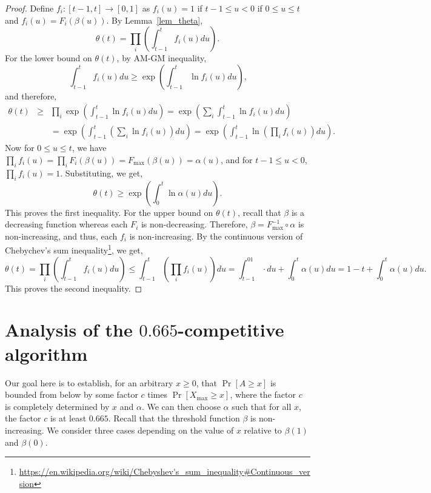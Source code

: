 \documentclass[10pt, letterpaper, twoside]{article}
\begin{document}
\begin{proof}
Define $f_i:[t-1,t]\longrightarrow[0,1]$ as $f_i(u)=1$ if $t-1\leq u<0$ if $0\leq u\leq t$ and $f_i(u)=F_i(\beta(u))$. By Lemma~\ref{lem_theta},
\[\theta(t)=\prod_i\left(\int_{t-1}^t f_i(u)du\right)\text{.}\]
For the lower bound on $\theta(t)$, by AM-GM inequality,
\[\int_{t-1}^tf_i(u)du\geq\exp\left(\int_{t-1}^t\ln f_i(u)du\right)\text{,}\]
and therefore,
\begin{eqnarray*}
\theta(t) & \geq & \prod_i\exp\left(\int_{t-1}^t\ln f_i(u)du\right)=\exp\left(\sum_i\int_{t-1}^t\ln f_i(u)du\right)\\
 & & =\exp\left(\int_{t-1}^t\left(\sum_i\ln f_i(u)\right)du\right)=\exp\left(\int_{t-1}^t\ln\left(\prod_i f_i(u)\right)du\right)\text{.}
\end{eqnarray*}
Now for $0\leq u\leq t$, we have $\prod_i f_i(u)=\prod_i F_i(\beta(u))=F_{\max}(\beta(u))=\alpha(u)$, and for $t-1\leq u<0$, $\prod_i f_i(u)=1$. Substituting, we get,
\[\theta(t)\geq\exp\left(\int_0^t\ln\alpha(u)du\right)\text{.}\]
This proves the first inequality. For the upper bound on $\theta(t)$, recall that $\beta$ is a decreasing function whereas each $F_i$ is non-decreasing. Therefore, $\beta=F_{\max}^{-1}\circ\alpha$ is non-increasing, and thus, each $f_i$ is non-increasing. By the continuous version of Chebychev's sum inequality\footnote{\url{https://en.wikipedia.org/wiki/Chebyshev's_sum_inequality\#Continuous_version}}, we get,
\[\theta(t)=\prod_i\left(\int_{t-1}^t f_i(u)du\right)\leq\int_{t-1}^t\left(\prod_if_i(u)\right)du=\int_{t-1}^01\cdot du+\int_0^t\alpha(u)du=1-t+\int_0^t\alpha(u)du\text{.}\]
This proves the second inequality.
\end{proof}


\section{Analysis of the $0.665$-competitive algorithm}

Our goal here is to establish, for an arbitrary $x\geq0$, that $\Pr[A\geq x]$ is bounded from below by some factor $c$ times $\Pr[X_{\max}\geq x]$, where the factor $c$ is completely determined by $x$ and $\alpha$. We can then choose $\alpha$ such that for all $x$, the factor $c$ is at least $0.665$. Recall that the threshold function $\beta$ is non-increasing. We consider three cases depending on the value of $x$ relative to $\beta(1)$ and $\beta(0)$. %
\end{document}
